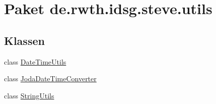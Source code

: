 \hypertarget{namespacede_1_1rwth_1_1idsg_1_1steve_1_1utils}{\section{Paket de.\-rwth.\-idsg.\-steve.\-utils}
\label{namespacede_1_1rwth_1_1idsg_1_1steve_1_1utils}
}
\subsection*{Klassen}
\begin{DoxyCompactItemize}
\item 
class \hyperlink{classde_1_1rwth_1_1idsg_1_1steve_1_1utils_1_1_date_time_utils}{Date\-Time\-Utils}
\item 
class \hyperlink{classde_1_1rwth_1_1idsg_1_1steve_1_1utils_1_1_joda_date_time_converter}{Joda\-Date\-Time\-Converter}
\item 
class \hyperlink{classde_1_1rwth_1_1idsg_1_1steve_1_1utils_1_1_string_utils}{String\-Utils}
\end{DoxyCompactItemize}
